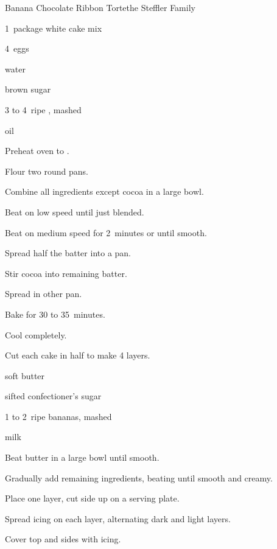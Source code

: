 \begin{recipe}{Banana Chocolate Ribbon Torte}{the Steffler Family}{}

\begin{ingredients}
\item 1~package white cake mix
\item 4~eggs
\item \C{\half} water
\item \C{\quarter} 
\item {} brown sugar
\item 3 to 4~ripe , mashed
\item \C{\third} oil
\end{ingredients}

\begin{directions}
\item Preheat oven to .
\item Flour two round pans.
\item Combine all ingredients except cocoa in a large bowl.
\item Beat on low speed until just blended.
\item Beat on medium speed for 2~minutes or until smooth.
\item Spread half the batter into a pan.
\item Stir cocoa into remaining batter.
\item Spread in other pan.
\item Bake for 30 to 35~minutes.
\item Cool completely.
\item Cut each cake in half to make 4 layers.
\end{directions}


\begin{ingredients}
\item \C{\half} soft butter
\item {} sifted confectioner's sugar
\item 1 to 2~ripe bananas, mashed 
\item {} milk
\end{ingredients}

\begin{directions}
\item Beat butter in a large bowl until smooth.
\item Gradually add remaining ingredients, beating until smooth and creamy.
\item Place one layer, cut side up on a serving plate.
\item Spread icing on each layer, alternating dark and light layers.
\item Cover top and sides with icing.
\end{directions}
\end{recipe}
